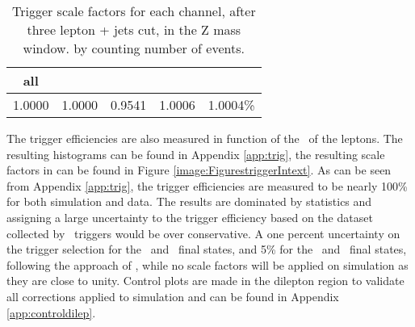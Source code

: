 \begin{table}[h]
	\centering
	\caption{Trigger scale factors for each channel, after three lepton + jets cut, in the Z mass window. by counting number of events.}
	\begin{tabular}{c|c|c|c|c}
		\hline 
		all & \mumumu & \eee & \eemu & \emumu \\ 
		\hline 
		1.0000 & 1.0000 & 0.9541 & 1.0006  & 1.0004\% \\ 
		\hline 
	\end{tabular} 
	\label{tab:trigSFe}
\end{table}

The trigger efficiencies are also measured in function of the \pt\ of the leptons. The resulting histograms can be found in Appendix \ref{app:trig}, the resulting scale factors in can be found in Figure \ref{image:FigurestriggerIntext}.
%	
As can be seen from Appendix \ref{app:trig}, the trigger efficiencies are measured to be nearly 100\% for both simulation and data. The results are dominated by statistics and assigning a large uncertainty to the trigger efficiency based on the dataset collected by \Etmis\ triggers would be over conservative. A one percent uncertainty on the trigger selection for the \eemu\ and \mumumu\ final states, and 5\% for the \eee\ and \emumu\ final states, following the approach of \cite{Sirunyan:2017kkr}, while no scale factors will be applied on simulation as they are close to unity. Control plots are made in the dilepton region to validate all corrections applied to simulation and can be found in Appendix \ref{app:controldilep}.


